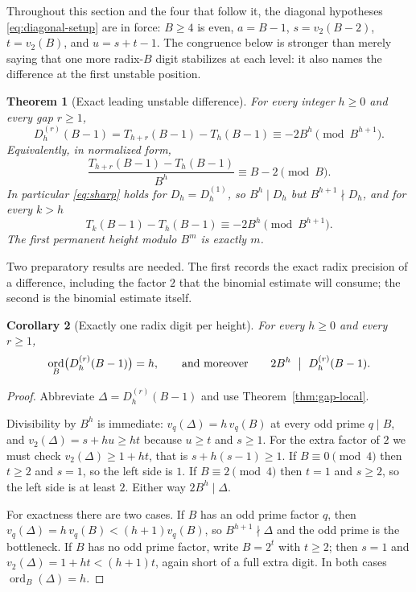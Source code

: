 \documentclass[11pt,letterpaper]{article}
\numberwithin{equation}{section}
\newtheorem{theorem}{Theorem}[section]
\newtheorem{corollary}[theorem]{Corollary}
\theoremstyle{definition}
\theoremstyle{remark}
\DeclareMathOperator{\ordop}{ord}
\begin{document}
Throughout this section and the four that follow it, the diagonal hypotheses \eqref{eq:diagonal-setup} are in force: $B\ge4$ is even, $a=B-1$, $s=v_2(B-2)$, $t=v_2(B)$, and $u=s+t-1$. The congruence below is stronger than merely saying that one more radix-$B$ digit stabilizes at each level: it also names the difference at the first unstable position.

\begin{theorem}[Exact leading unstable difference]\label{thm:sharp}
For every integer $h\ge0$ and every gap $r\ge1$,
\begin{equation}\label{eq:sharp}
 \boxed{\ D_h^{(r)}(B-1)=T_{h+r}(B-1)-T_h(B-1)\equiv-2B^h\pmod{B^{h+1}}.\ }
\end{equation}
Equivalently, in normalized form,
\begin{equation}\label{eq:normalized}
 \frac{T_{h+r}(B-1)-T_h(B-1)}{B^h}\equiv B-2\pmod B .
\end{equation}
In particular \eqref{eq:sharp} holds for $D_h=D_h^{(1)}$, so $B^h\mid D_h$ but $B^{h+1}\nmid D_h$, and for every $k>h$
\begin{equation}\label{eq:sharp-telescope}
 T_k(B-1)-T_h(B-1)\equiv-2B^h\pmod{B^{h+1}}.
\end{equation}
The first permanent height modulo $B^m$ is exactly $m$.
\end{theorem}

Two preparatory results are needed. The first records the exact radix precision of a difference, including the factor $2$ that the binomial estimate will consume; the second is the binomial estimate itself.

\begin{corollary}[Exactly one radix digit per height]\label{cor:order}
For every $h\ge0$ and every $r\ge1$,
\begin{equation}\label{eq:exact-order}
 \ordop_B\bigl(D_h^{(r)}(B-1)\bigr)=h,
 \qquad\text{and moreover}\qquad
 2B^h\ \bigm|\ D_h^{(r)}(B-1).
\end{equation}
\end{corollary}
\begin{proof}
Abbreviate $\Delta=D_h^{(r)}(B-1)$ and use Theorem~\ref{thm:gap-local}.

Divisibility by $B^h$ is immediate: $v_q(\Delta)=h\,v_q(B)$ at every odd prime $q\mid B$, and $v_2(\Delta)=s+hu\ge ht$ because $u\ge t$ and $s\ge1$. For the extra factor of $2$ we must check $v_2(\Delta)\ge1+ht$, that is $s+h(s-1)\ge1$. If $B\equiv0\pmod 4$ then $t\ge2$ and $s=1$, so the left side is $1$. If $B\equiv2\pmod4$ then $t=1$ and $s\ge2$, so the left side is at least $2$. Either way $2B^h\mid\Delta$.

For exactness there are two cases. If $B$ has an odd prime factor $q$, then $v_q(\Delta)=h\,v_q(B)<(h+1)v_q(B)$, so $B^{h+1}\nmid\Delta$ and the odd prime is the bottleneck. If $B$ has no odd prime factor, write $B=2^t$ with $t\ge2$; then $s=1$ and $v_2(\Delta)=1+ht<(h+1)t$, again short of a full extra digit. In both cases $\ordop_B(\Delta)=h$.
\end{proof}
\end{document}
